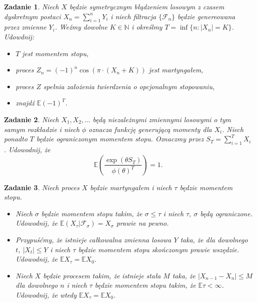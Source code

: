\documentclass{mwart}
\newtheorem{zd}{Zadanie}
\begin{document}
\begin{zd}
Niech $X$ będzie symetrycznym błądzeniem losowym z czasem dyskretnym postaci $X_n = \sum_{i=1}^nY_i$ i niech filtracja $\{\mathcal{F}_n\}$ będzie genereowana przez zmienne $Y_i$. Weźmy dowolne $K\in \mathbb{N}$ i określmy $T = \inf\{n\colon |X_n|=K\}$. Udowdnij:
\begin{itemize}
\item $T$ jest momentem stopu,
\item proces $Z_n = (-1)^n\cos\left(\pi\cdot (X_n+K)\right)$ jest martyngałem,
\item proces $Z$ spełnia założenia twierdzenia o opcjonalnym stopowaniu,
\item znajdź $\mathbb{E}(-1)^T$.
\end{itemize}
\end{zd}


\begin{zd}
Niech $X_1, X_2, \dots$ będą niezależnymi zmiennymi losowymi o tym samym rozkładzie i niech $\phi$ oznacza funkcję generującą momenty dla $X_i$. Niech ponadto $T$ będzie ograniczonym momentem stopu. Oznaczmy przez $S_T=\sum_{i=1}^TX_i$. Udowodnij, że
\begin{displaymath}
\mathbb{E}\left(\frac{\exp{(\theta S_T)}}{\phi(\theta)^T}\right)=1.
\end{displaymath}
\end{zd}

\begin{zd}
Niech proces $X$ będzie martyngałem i niech $\tau$ będzie momentem stopu.
\begin{itemize}
\item Niech $\sigma$ będzie momentem stopu takim, że $\sigma \leq \tau$ i niech $\tau,\ \sigma$ będą ograniczone. Udowodnij, że $\mathbb{E}\left(X_{\tau}|\mathcal{F}_{\sigma}\right) = X_{\sigma}$ prawie na pewno.
\item Przypuśćmy, że istnieje całkowalna zmienna losowa $Y$ taka, że dla dowolnego $t$, $|X_t| \leq Y$ i niech $\tau$ będzie momentem stopu skończonym prawie wszędzie. Udowodnij, że $\mathbb{E}X_{\tau} = \mathbb{E}X_0 $.
\item Niech $X$ będzie procesem takim, że istnieje stała $M$ taka, że $|X_{n-1} - X_n| \leq M$ dla dowolnego $n$ i niech $\tau$ będzie momentem stopu takim, że $\mathbb{E}\tau < \infty$. Udowodnij, że wtedy $\mathbb{E}X_{\tau} = \mathbb{E}X_0$.
\end{itemize}
\end{zd}
\end{document}

